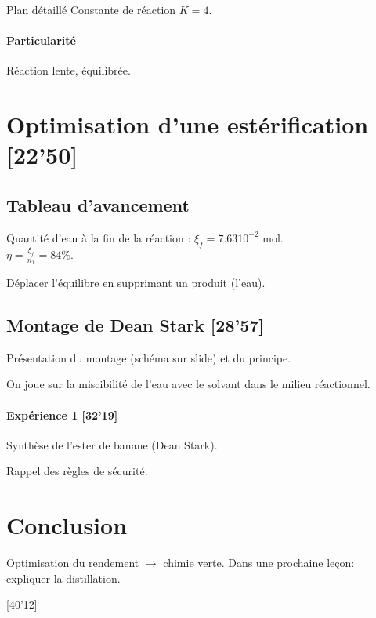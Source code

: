 \begin{reportBlock}{Plan détaillé}
Constante de réaction $K = 4$.


\paragraph{Particularité} Réaction lente, équilibrée.

\section{Optimisation d'une estérification [22'50]}


\subsection{Tableau d'avancement}


Quantité d'eau à la fin de la réaction : $\xi_f = 7.63 10^{-2}$ mol. \\
$\eta = \frac{\xi_f}{n_1} = 84\%$.

Déplacer l'équilibre en supprimant un produit (l'eau).

\subsection{Montage de Dean Stark [28'57]}

Présentation du montage (schéma sur slide) et du principe.

On joue sur la miscibilité de l'eau avec le solvant dans le milieu réactionnel.

\paragraph{Expérience 1 [32'19]} Synthèse de l'ester de banane (Dean Stark).

Rappel des règles de sécurité. 

\section*{Conclusion}

Optimisation du rendement $\rightarrow$ chimie verte. Dans une prochaine leçon: expliquer la distillation.

[40'12]

\end{reportBlock}

